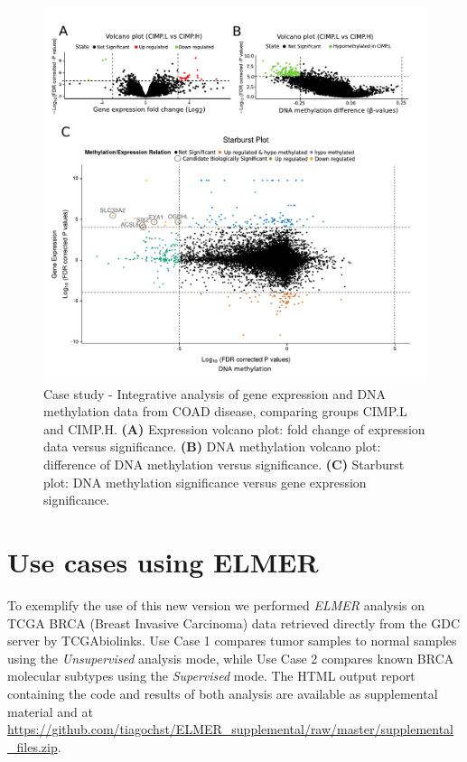 \begin{figure}
\centering
\includegraphics[width=1.0\linewidth]{images/figure5.pdf}
\caption[Case study - Integrative data analysis of Colon Adenocarcinoma]{
Case study - Integrative analysis of gene expression and DNA methylation data from COAD disease,
comparing groups CIMP.L and CIMP.H. \textbf{(A)} Expression volcano plot: fold change of expression data versus significance.
 \textbf{(B)} DNA methylation volcano plot: difference of DNA methylation versus significance.
 \textbf{(C)} Starburst plot: DNA methylation significance versus gene expression significance.}
\label{fig:case_starburst}
\end{figure}


\section{Use cases using ELMER}\label{sec:analysis_elmer}

To exemplify the use of this new version we performed \textit{ELMER} analysis on TCGA BRCA (Breast Invasive Carcinoma) data retrieved directly from the GDC server by TCGAbiolinks. Use Case 1 compares tumor samples to normal samples using the \textit{Unsupervised} analysis mode, while Use Case 2 compares known BRCA molecular subtypes using the \textit{Supervised} mode. The HTML output report containing the code and results of both analysis are available as supplemental material and at \url{https://github.com/tiagochst/ELMER_supplemental/raw/master/supplemental_files.zip}.

